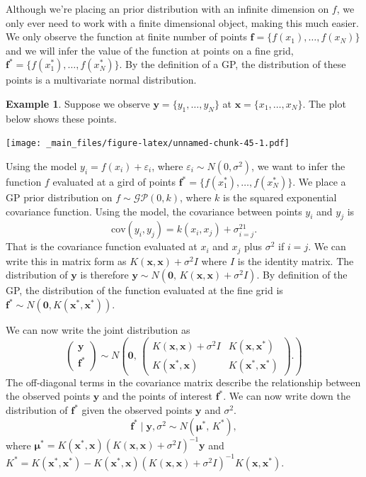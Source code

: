 \documentclass[
]{book}
\theoremstyle{definition}
\theoremstyle{definition}
\newtheorem{example}{Example}[chapter]
\theoremstyle{definition}
\theoremstyle{definition}
\theoremstyle{remark}
\begin{document}
Although we're placing an prior distribution with an infinite dimension on \(f\), we only ever need to work with a finite dimensional object, making this much easier. We only observe the function at finite number of points \(\boldsymbol{f} = \{f(x_1), \ldots, f(x_N)\}\) and we will infer the value of the function at points on a fine grid, \(\boldsymbol{f}^* = \{f(x_1^*), \ldots, f(x_N^*)\}\). By the definition of a GP, the distribution of these points is a multivariate normal distribution.

\begin{example}
Suppose we observe \(\boldsymbol{y} = \{y_1, \ldots, y_N\}\) at \(\boldsymbol{x} = \{x_1, \ldots, x_N\}\). The plot below shows these points.

\texttt{[image: \_main\_files/figure-latex/unnamed-chunk-45-1.pdf]}

Using the model \(y_i = f(x_i) + \varepsilon_i\), where \(\varepsilon_i \sim N(0, \sigma^2)\), we want to infer the function \(f\) evaluated at a gird of points \(\boldsymbol{f}^* = \{f(x_1^*), \ldots, f(x_N^*)\}\). We place a GP prior distribution on \(f \sim \mathcal{GP}(0, k)\), where \(k\) is the squared exponential covariance function. Using the model, the covariance between points \(y_i\) and \(y_j\) is
\[
\textrm{cov}(y_i, y_j) = k(x_i, x_j) + \sigma^21_{i=j}.
\]
That is the covariance function evaluated at \(x_i\) and \(x_j\) plus \(\sigma^2\) if \(i = j\). We can write this in matrix form as \(K(\boldsymbol{x}, \boldsymbol{x}) + \sigma^2I\) where \(I\) is the identity matrix. The distribution of \(\boldsymbol{y}\) is therefore \(\boldsymbol{y} \sim N(\boldsymbol{0}, \, K(\boldsymbol{x}, \boldsymbol{x}) + \sigma^2I)\). By definition of the GP, the distribution of the function evaluated at the fine grid is \(\boldsymbol{f}^* \sim N(\boldsymbol{0}, K(\boldsymbol{x}^*, \boldsymbol{x}^*))\).

We can now write the joint distribution as
\[
\begin{pmatrix}
\boldsymbol{y} \\
\boldsymbol{f}^*
\end{pmatrix} \sim N\left(\boldsymbol{0}, \,
\begin{pmatrix}
 K(\boldsymbol{x}, \boldsymbol{x}) + \sigma^2I &  K(\boldsymbol{x}, \boldsymbol{x}^*)\\
K(\boldsymbol{x}^*, \boldsymbol{x}) & K(\boldsymbol{x}^*, \boldsymbol{x}^*)
\end{pmatrix}.
\right)
\]
The off-diagonal terms in the covariance matrix describe the relationship between the observed points \(\boldsymbol{y}\) and the points of interest \(\boldsymbol{f}^*\). We can now write down the distribution of \(\boldsymbol{f}^*\) given the observed points \(\boldsymbol{y}\) and \(\sigma^2\).
\[
\boldsymbol{f}^* \mid \boldsymbol{y}, \sigma^2 \sim N(\boldsymbol{\mu}^*, \, K^*),
\]
where \(\boldsymbol{\mu}^* = K(\boldsymbol{x}^*, \boldsymbol{x})(K(\boldsymbol{x}, \boldsymbol{x}) + \sigma^2 I)^{-1} \boldsymbol{y}\) and \(K^* = K(\boldsymbol{x}^*, \boldsymbol{x}^*) - K(\boldsymbol{x}^*, \boldsymbol{x})(K(\boldsymbol{x}, \boldsymbol{x}) + \sigma^2I)^{-1}K(\boldsymbol{x}, \boldsymbol{x}^*)\).


\end{example}
\end{document}
